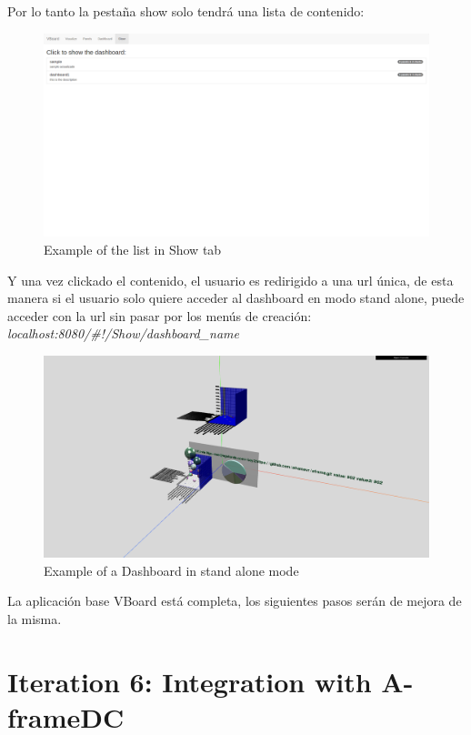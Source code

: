 \documentclass[a4paper, 12pt]{book}
\begin{document}
Por lo tanto la pestaña show solo tendrá una lista de contenido:

\begin{figure}[H]
  \centering
  \includegraphics[width=16cm, keepaspectratio]{img/development/exampleshow}
  \caption{Example of the list in Show tab}
  \label{fig:exampleshow}
\end{figure}

Y una vez clickado el contenido, el usuario es redirigido a una url única, de esta manera si el usuario solo quiere acceder al dashboard en modo stand alone, puede acceder con la url sin pasar por los menús de creación: \textit{ localhost:8080/\#!/Show/dashboard\_name}

\begin{figure}[H]
  \centering
  \includegraphics[width=16cm, keepaspectratio]{img/development/examplestandalone}
  \caption{Example of a Dashboard in stand alone mode}
  \label{fig:examplestandalone}
\end{figure}


La aplicación base VBoard está completa, los siguientes pasos serán de mejora de la misma.

\section{Iteration 6: Integration with A-frameDC}
\end{document}
